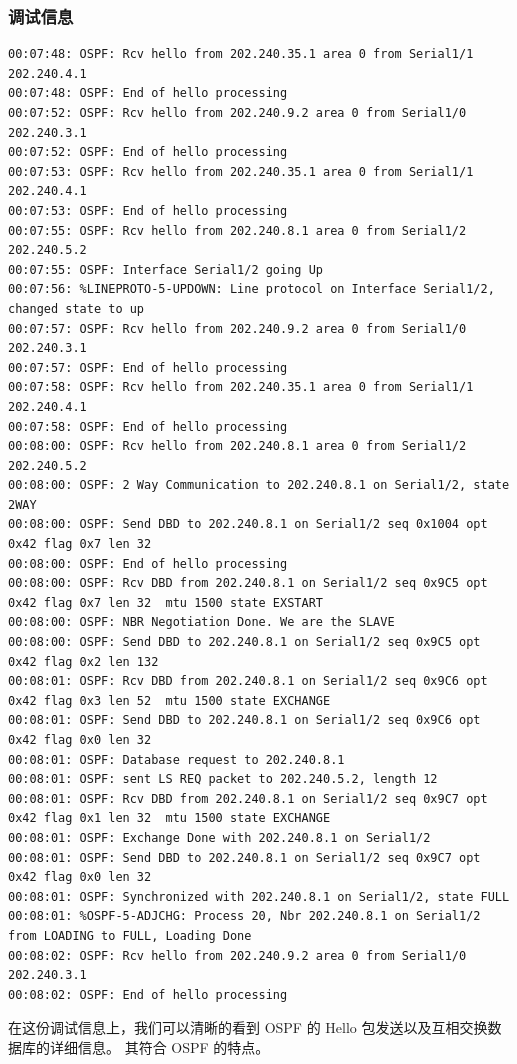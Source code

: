 \documentclass[black,normal,cn]{elegantnote}
\begin{document}
\subsubsection{调试信息}
\begin{lstlisting}
00:07:48: OSPF: Rcv hello from 202.240.35.1 area 0 from Serial1/1 202.240.4.1
00:07:48: OSPF: End of hello processing
00:07:52: OSPF: Rcv hello from 202.240.9.2 area 0 from Serial1/0 202.240.3.1
00:07:52: OSPF: End of hello processing
00:07:53: OSPF: Rcv hello from 202.240.35.1 area 0 from Serial1/1 202.240.4.1
00:07:53: OSPF: End of hello processing
00:07:55: OSPF: Rcv hello from 202.240.8.1 area 0 from Serial1/2 202.240.5.2
00:07:55: OSPF: Interface Serial1/2 going Up
00:07:56: %LINEPROTO-5-UPDOWN: Line protocol on Interface Serial1/2, changed state to up
00:07:57: OSPF: Rcv hello from 202.240.9.2 area 0 from Serial1/0 202.240.3.1
00:07:57: OSPF: End of hello processing
00:07:58: OSPF: Rcv hello from 202.240.35.1 area 0 from Serial1/1 202.240.4.1
00:07:58: OSPF: End of hello processing
00:08:00: OSPF: Rcv hello from 202.240.8.1 area 0 from Serial1/2 202.240.5.2
00:08:00: OSPF: 2 Way Communication to 202.240.8.1 on Serial1/2, state 2WAY
00:08:00: OSPF: Send DBD to 202.240.8.1 on Serial1/2 seq 0x1004 opt 0x42 flag 0x7 len 32
00:08:00: OSPF: End of hello processing
00:08:00: OSPF: Rcv DBD from 202.240.8.1 on Serial1/2 seq 0x9C5 opt 0x42 flag 0x7 len 32  mtu 1500 state EXSTART
00:08:00: OSPF: NBR Negotiation Done. We are the SLAVE
00:08:00: OSPF: Send DBD to 202.240.8.1 on Serial1/2 seq 0x9C5 opt 0x42 flag 0x2 len 132
00:08:01: OSPF: Rcv DBD from 202.240.8.1 on Serial1/2 seq 0x9C6 opt 0x42 flag 0x3 len 52  mtu 1500 state EXCHANGE
00:08:01: OSPF: Send DBD to 202.240.8.1 on Serial1/2 seq 0x9C6 opt 0x42 flag 0x0 len 32
00:08:01: OSPF: Database request to 202.240.8.1
00:08:01: OSPF: sent LS REQ packet to 202.240.5.2, length 12
00:08:01: OSPF: Rcv DBD from 202.240.8.1 on Serial1/2 seq 0x9C7 opt 0x42 flag 0x1 len 32  mtu 1500 state EXCHANGE
00:08:01: OSPF: Exchange Done with 202.240.8.1 on Serial1/2
00:08:01: OSPF: Send DBD to 202.240.8.1 on Serial1/2 seq 0x9C7 opt 0x42 flag 0x0 len 32
00:08:01: OSPF: Synchronized with 202.240.8.1 on Serial1/2, state FULL
00:08:01: %OSPF-5-ADJCHG: Process 20, Nbr 202.240.8.1 on Serial1/2 from LOADING to FULL, Loading Done
00:08:02: OSPF: Rcv hello from 202.240.9.2 area 0 from Serial1/0 202.240.3.1
00:08:02: OSPF: End of hello processing
\end{lstlisting}

在这份调试信息上，我们可以清晰的看到 OSPF 的 Hello 包发送以及互相交换数据库的详细信息。
其符合 OSPF 的特点。
\end{document}
